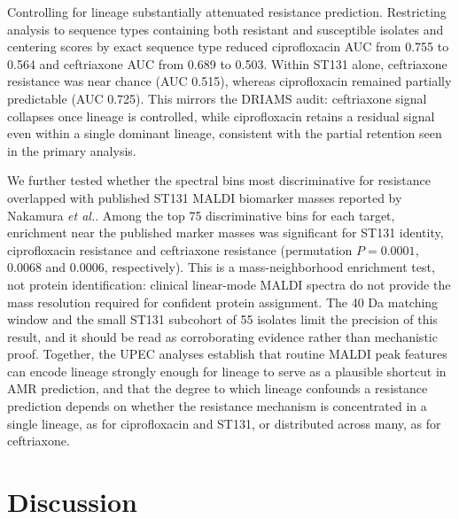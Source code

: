 \documentclass[11pt]{article}
\begin{document}
Controlling for lineage substantially attenuated resistance prediction. Restricting analysis to sequence types containing both resistant and susceptible isolates and centering scores by exact sequence type reduced ciprofloxacin AUC from 0.755 to 0.564 and ceftriaxone AUC from 0.689 to 0.503. Within ST131 alone, ceftriaxone resistance was near chance (AUC 0.515), whereas ciprofloxacin remained partially predictable (AUC 0.725). This mirrors the DRIAMS audit: ceftriaxone signal collapses once lineage is controlled, while ciprofloxacin retains a residual signal even within a single dominant lineage, consistent with the partial retention seen in the primary analysis.





We further tested whether the spectral bins most discriminative for resistance overlapped with published ST131 MALDI biomarker masses reported by Nakamura \textit{et al.}\cite{nakamura2019st131}. Among the top 75 discriminative bins for each target, enrichment near the published marker masses was significant for ST131 identity, ciprofloxacin resistance and ceftriaxone resistance (permutation $P = 0.0001$, 0.0068 and 0.0006, respectively). This is a mass-neighborhood enrichment test, not protein identification: clinical linear-mode MALDI spectra do not provide the mass resolution required for confident protein assignment. The 40 Da matching window and the small ST131 subcohort of 55 isolates limit the precision of this result, and it should be read as corroborating evidence rather than mechanistic proof. Together, the UPEC analyses establish that routine MALDI peak features can encode lineage strongly enough for lineage to serve as a plausible shortcut in AMR prediction, and that the degree to which lineage confounds a resistance prediction depends on whether the resistance mechanism is concentrated in a single lineage, as for ciprofloxacin and ST131, or distributed across many, as for ceftriaxone.

\section*{Discussion}
\end{document}
